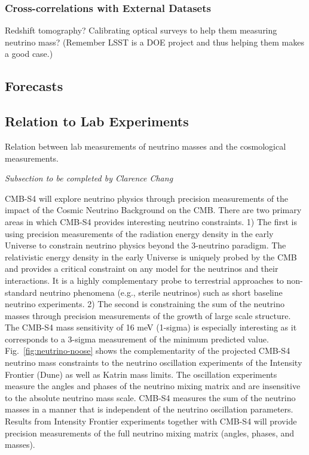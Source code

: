 \subsubsection{Cross-correlations with External Datasets}
Redshift tomography?  Calibrating optical surveys to help them measuring
neutrino mass?  (Remember LSST is a DOE project and thus helping them
makes a good case.)


\subsection{Forecasts}

\subsection{Relation to Lab Experiments}

Relation between lab measurements of neutrino masses and the cosmological measurements.

{\it Subsection to be completed by Clarence Chang}

CMB-S4 will explore neutrino physics through precision measurements of the impact of the Cosmic Neutrino Background on the CMB.  There are two primary areas in which CMB-S4 provides interesting neutrino constraints.
 1) The first is using precision measurements of the radiation energy density in the early Universe to constrain neutrino physics beyond the 3-neutrino paradigm. The relativistic energy density in the early Universe is uniquely probed by the CMB and provides a critical constraint on any model for the neutrinos and their interactions. It is a highly complementary probe to terrestrial approaches to non-standard neutrino phenomena (e.g., sterile neutrinos) such as short baseline neutrino experiments. 
 2) The second is constraining the sum of the neutrino masses through precision measurements of the growth of large scale structure. The CMB-S4 mass sensitivity of 16 meV (1-sigma) is especially interesting as it corresponds to a 3-sigma measurement of the minimum predicted value. Fig.~\ref{fig:neutrino-noose} shows the complementarity of the projected CMB-S4 neutrino mass constraints to the neutrino oscillation experiments of the Intensity Frontier (Dune) as well as Katrin mass limits. The oscillation experiments measure the angles and phases of the neutrino mixing matrix and are insensitive to the absolute neutrino mass scale. CMB-S4 measures the sum of the neutrino masses in a manner that is independent of the neutrino oscillation parameters. Results from Intensity Frontier experiments together with CMB-S4 will provide precision measurements of the full neutrino mixing matrix (angles, phases, and masses).
 
